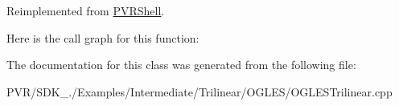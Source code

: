 Reimplemented from \hyperlink{class_p_v_r_shell_ae0eb5f797cbe993a22b8659f9c332578}{P\+V\+R\+Shell}.



Here is the call graph for this function\+:




The documentation for this class was generated from the following file\+:\begin{DoxyCompactItemize}
\item 
P\+V\+R/\+S\+D\+K\+\_./\+Examples/\+Intermediate/\+Trilinear/\+O\+G\+L\+E\+S/O\+G\+L\+E\+S\+Trilinear.\+cpp\end{DoxyCompactItemize}

